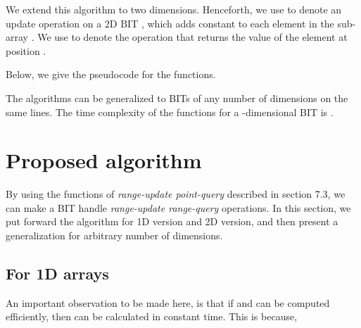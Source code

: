 \documentclass[a4paper]{article}
\begin{document}
\vspace{2 mm}
We extend this algorithm to two dimensions. Henceforth, we use  to denote an update operation on a 2D BIT , which adds constant  to each element in the sub-array . We use  to denote the operation that returns the value of the element at position .

\vspace{2 mm}
Below, we give the pseudocode for the functions.

\vspace {3 mm}
\noindent
{}
\begin{algorithmic}[1]

        \State 
        \State 
        \State 
        \State 
\EndFunction
\end{algorithmic}

\vspace {3 mm}
\noindent
{}
\begin{algorithmic}[1]

        \State 
        \State 
        \While {}
            \State 
            \While{}
                \State 
                \State 
            \EndWhile
            \State 
        \EndWhile
        \State \Return 
\EndFunction
\end{algorithmic}

\vspace{3 mm}
The algorithms can be generalized to BITs of any number of dimensions on the same lines. The time complexity of the functions for a -dimensional BIT is .



\section{Proposed algorithm}
By using the functions of \textit{range-update point-query} described in section 7.3, we can make a BIT handle \textit{range-update range-query} operations. In this section, we put forward the algorithm for 1D version and 2D version, and then present a generalization for arbitrary number of dimensions.



\subsection{For 1D arrays}
An important observation to be made here, is that if  and  can be computed efficiently, then  can be calculated in constant time. This is because,
\end{document}
